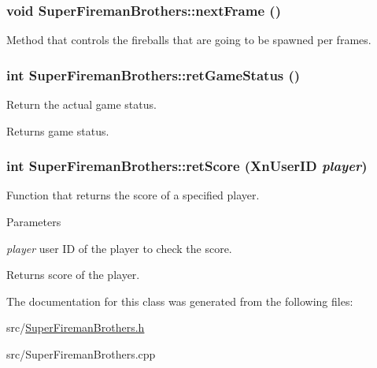 \hypertarget{classSuperFiremanBrothers_a9ef3423cc1e1b9cb563e4bbf933f5e56}{
\subsubsection[{nextFrame}]{\setlength{\rightskip}{0pt plus 5cm}void SuperFiremanBrothers::nextFrame ()}}
\label{classSuperFiremanBrothers_a9ef3423cc1e1b9cb563e4bbf933f5e56}
Method that controls the fireballs that are going to be spawned per frames. \hypertarget{classSuperFiremanBrothers_a7a6d295519c8e1ba92be19f2745f040e}{
\subsubsection[{retGameStatus}]{\setlength{\rightskip}{0pt plus 5cm}int SuperFiremanBrothers::retGameStatus ()}}
\label{classSuperFiremanBrothers_a7a6d295519c8e1ba92be19f2745f040e}
Return the actual game status. \begin{DoxyReturn}{Returns}
game status. 
\end{DoxyReturn}
\hypertarget{classSuperFiremanBrothers_afd61723532625d9895654ecdf1ab0d96}{
\subsubsection[{retScore}]{\setlength{\rightskip}{0pt plus 5cm}int SuperFiremanBrothers::retScore (XnUserID {\em player})}}
\label{classSuperFiremanBrothers_afd61723532625d9895654ecdf1ab0d96}
Function that returns the score of a specified player. 
\begin{DoxyParams}{Parameters}
\item[{\em player}]user ID of the player to check the score. \end{DoxyParams}
\begin{DoxyReturn}{Returns}
score of the player. 
\end{DoxyReturn}


The documentation for this class was generated from the following files:\begin{DoxyCompactItemize}
\item 
src/\hyperlink{SuperFiremanBrothers_8h}{SuperFiremanBrothers.h}\item 
src/SuperFiremanBrothers.cpp\end{DoxyCompactItemize}
